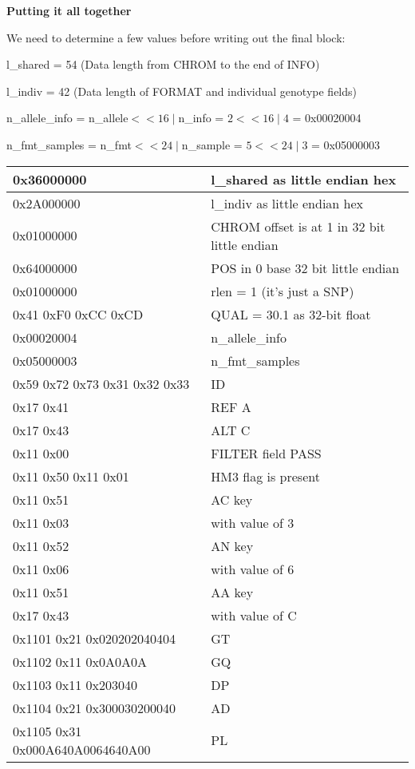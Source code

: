 \documentclass[8pt]{article}
\begin{document}
\textbf{Putting it all together}

We need to determine a few values before writing out the final block:

l\_shared = 54 (Data length from CHROM to the end of INFO)

l\_indiv = 42 (Data length of FORMAT and individual genotype fields)

n\_allele\_info = n\_allele$<<16\mid$n\_info = $2 << 16 \mid 4$ = 0x00020004

n\_fmt\_samples = n\_fmt$<<24\mid$n\_sample = $5 << 24 \mid 3$ = 0x05000003


\vspace{0.3cm}
\begin{tabular}{|l| l|} \hline
0x36000000 & l\_shared as little endian hex \\ \hline
0x2A000000 & l\_indiv as little endian hex \\ \hline
0x01000000 & CHROM offset is at 1 in 32 bit little endian \\ \hline
0x64000000 & POS in 0 base 32 bit little endian \\ \hline
0x01000000 & rlen = 1 (it's just a SNP) \\ \hline
0x41 0xF0 0xCC 0xCD & QUAL = 30.1 as 32-bit float \\ \hline
0x00020004 & n\_allele\_info \\ \hline
0x05000003 & n\_fmt\_samples \\ \hline
0x59 0x72 0x73 0x31 0x32 0x33 & ID \\ \hline
0x17 0x41 & REF A \\ \hline
0x17 0x43 & ALT C \\ \hline
0x11 0x00 & FILTER field PASS \\ \hline
0x11 0x50 0x11 0x01 & HM3 flag is present \\ \hline
0x11 0x51 & AC key \\ \hline
0x11 0x03 & with value of 3 \\ \hline
0x11 0x52 & AN key \\ \hline
0x11 0x06 & with value of 6 \\ \hline
0x11 0x51 & AA key \\ \hline
0x17 0x43 & with value of C \\ \hline
0x1101 0x21 0x020202040404 & GT \\ \hline
0x1102 0x11 0x0A0A0A & GQ \\ \hline
0x1103 0x11 0x203040 & DP \\ \hline
0x1104 0x21 0x300030200040 & AD \\ \hline
0x1105 0x31 0x000A640A0064640A00 & PL \\ \hline
\end{tabular}
\vspace{0.3cm}
\end{document}
